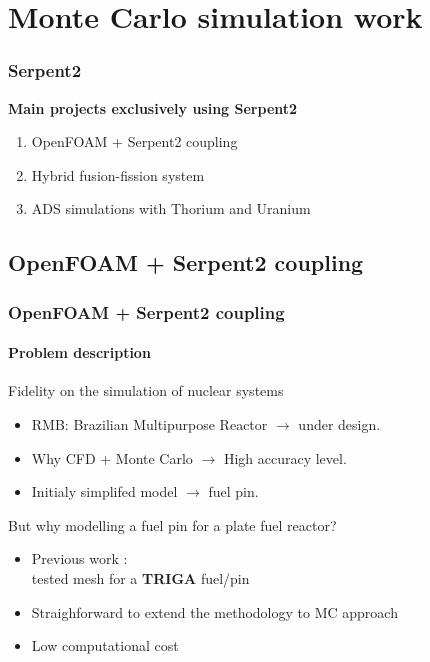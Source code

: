 \documentclass[svgnames,smaller,table]{beamer}
\begin{document}
\section{Monte Carlo simulation work}
\begin{frame}
  \frametitle{Serpent2}
  \textbf{Main projects exclusively using Serpent2}
  \vspace{10px}
  \begin{enumerate}
    \item OpenFOAM + Serpent2 coupling
    \item Hybrid fusion-fission system
    \item ADS simulations with Thorium and Uranium
    \end{enumerate}
\end{frame}

\subsection{OpenFOAM + Serpent2 coupling}
\begin{frame}
  \frametitle{OpenFOAM + Serpent2 coupling}
  \framesubtitle{Problem description}
  \begin{center}
    \alert{Fidelity on the simulation of nuclear systems}\\
    \vspace{10px}
    \begin{itemize}
    \item RMB: Brazilian Multipurpose Reactor $\rightarrow$ under design.
    \item Why CFD + Monte Carlo $\rightarrow$ High accuracy level.
    \item Initialy simplifed model $\rightarrow$ fuel pin.
    \end{itemize}
    But why modelling a fuel pin for a plate fuel reactor?
    \begin{itemize}
    \item Previous work \cite{Vasconcelos2018}:\\ tested mesh for a \textbf{TRIGA} fuel/pin
    \item Straighforward to extend the methodology to MC approach
    \item Low computational cost
    \end{itemize}
  \end{center}
\end{frame}
\end{document}
